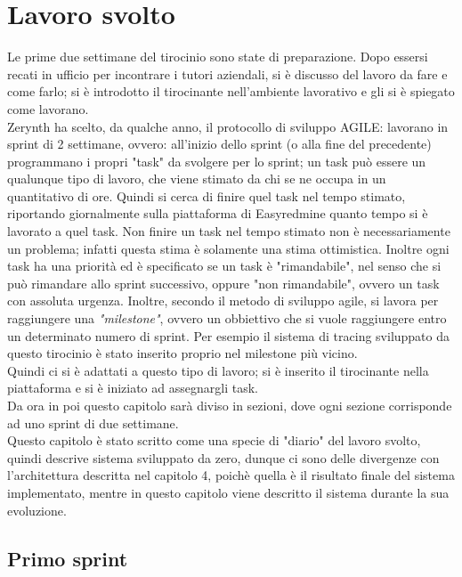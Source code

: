 \documentclass[a4paper,12pt,titlepage,italian,openany]{report}
\begin{document}
\chapter{Lavoro svolto}
Le prime due settimane del tirocinio sono state di preparazione. Dopo essersi recati in ufficio per incontrare i tutori aziendali, si è discusso
del lavoro da fare e come farlo; si è introdotto il tirocinante nell'ambiente lavorativo e gli si è spiegato come lavorano.\\
Zerynth ha scelto, da qualche anno, il protocollo di sviluppo AGILE: lavorano in sprint di 2 settimane, ovvero: all'inizio dello sprint (o alla fine del precedente) programmano i propri "task" da svolgere per lo sprint; un task può essere un qualunque tipo di lavoro, che viene stimato da chi se ne occupa in un quantitativo di ore. Quindi si cerca di finire quel task nel tempo stimato, riportando giornalmente sulla piattaforma di Easyredmine quanto tempo si è lavorato a quel task.
Non finire un task nel tempo stimato non è necessariamente un problema; infatti questa stima è solamente una stima ottimistica. Inoltre ogni task ha una priorità ed è specificato se un task è "rimandabile", nel senso che si può rimandare allo sprint successivo, oppure "non rimandabile", ovvero un task con assoluta urgenza. Inoltre, secondo il metodo di sviluppo agile,  si lavora per raggiungere una \textit{"milestone"}, ovvero un obbiettivo che si vuole raggiungere entro un determinato numero di sprint. Per esempio il sistema di tracing sviluppato da questo tirocinio è stato inserito proprio nel milestone più  vicino.\\
Quindi ci si è adattati a questo tipo di lavoro; si è inserito il tirocinante nella piattaforma e si è iniziato ad assegnargli task.\\
Da ora in poi questo capitolo sarà diviso in sezioni, dove ogni sezione corrisponde ad uno sprint di due settimane.
\\Questo capitolo è stato scritto come una specie di "diario" del lavoro svolto, quindi descrive sistema sviluppato da zero, dunque ci sono delle divergenze con l'architettura descritta nel capitolo 4, poichè quella è il risultato finale del sistema implementato, mentre in questo capitolo viene descritto il sistema durante la sua evoluzione.
\section{Primo sprint}
\end{document}
